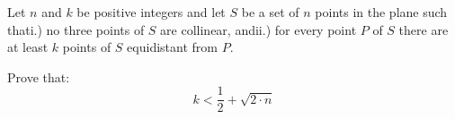 Let $ n$ and $ k$ be positive integers and let $ S$ be a set of $ n$ points in the plane such thati.) no three points of $ S$ are collinear, andii.) for every point $ P$ of $ S$ there are at least $ k$ points of $ S$ equidistant from $ P.$

Prove that:\[ k < \frac {1}{2} + \sqrt {2 \cdot n}
\]
